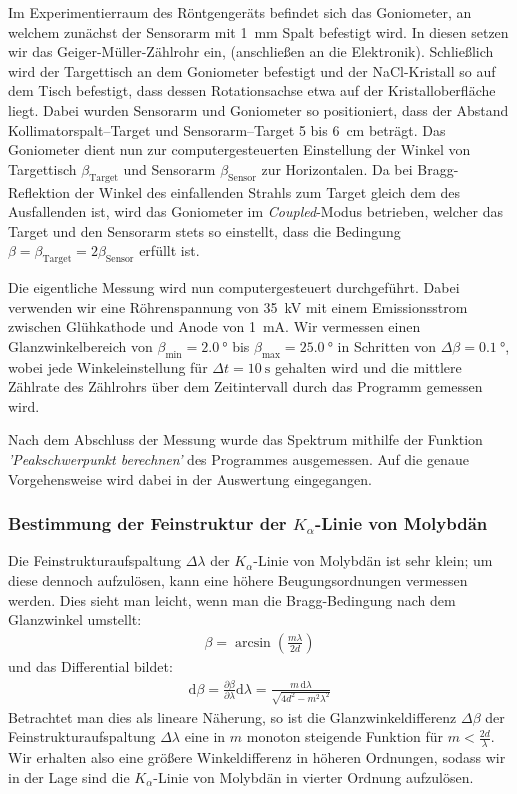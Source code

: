 \documentclass[10pt, a4paper]{article}
\begin{document}
Im Experimentierraum des Röntgengeräts befindet sich das Goniometer, an welchem zunächst der Sensorarm mit \SI{1}{\milli\metre} Spalt befestigt wird.
In diesen setzen wir das Geiger-Müller-Zählrohr ein, (anschließen an die Elektronik).
Schließlich wird der Targettisch an dem Goniometer befestigt und der NaCl-Kristall so auf dem Tisch befestigt, dass dessen Rotationsachse etwa auf der Kristalloberfläche liegt.
Dabei wurden Sensorarm und Goniometer so positioniert, dass der Abstand Kollimatorspalt--Target und Sensorarm--Target \num{5} bis \SI{6}{\centi\metre} beträgt.
Das Goniometer dient nun zur computergesteuerten Einstellung der Winkel von Targettisch $\beta_\mathrm{Target}$ und Sensorarm $\beta_\mathrm{Sensor}$ zur Horizontalen.
Da bei Bragg-Reflektion der Winkel des einfallenden Strahls zum Target gleich dem des Ausfallenden ist, wird das Goniometer im \emph{Coupled}-Modus betrieben, welcher das Target und den Sensorarm stets so einstellt, dass die Bedingung $\beta = \beta_\mathrm{Target} = 2\beta_\mathrm{Sensor}$ erfüllt ist.

Die eigentliche Messung wird nun computergesteuert durchgeführt.
Dabei verwenden wir eine Röhrenspannung von \SI{35}{\kilo\volt} mit einem Emissionsstrom zwischen Glühkathode und Anode von \SI{1}{\milli\ampere}.
Wir vermessen einen Glanzwinkelbereich von $\beta_\mathrm{min} = \SI{2,0}{\degree}$ bis $\beta_\mathrm{max} = \SI{25,0}{\degree}$ in Schritten von $\Delta \beta = \SI{0,1}{\degree}$, wobei jede Winkeleinstellung für $\Delta t = \SI{10}{\second}$ gehalten wird und die mittlere Zählrate des Zählrohrs über dem Zeitintervall durch das Programm gemessen wird.

Nach dem Abschluss der Messung wurde das Spektrum mithilfe der Funktion \emph{'Peakschwerpunkt berechnen'} des Programmes ausgemessen. Auf die genaue Vorgehensweise wird dabei in der Auswertung eingegangen.

\subsubsection{Bestimmung der Feinstruktur der $K_\alpha$-Linie von Molybdän}
Die Feinstrukturaufspaltung $\Delta \lambda$ der $K_\alpha$-Linie von Molybdän ist sehr klein; um diese dennoch aufzulösen, kann eine höhere Beugungsordnungen vermessen werden.
Dies sieht man leicht, wenn man die Bragg-Bedingung nach dem Glanzwinkel umstellt:
\begin{align}
  \beta = \arcsin \left( \frac{m \lambda}{2 d} \right)
\end{align}
und das Differential bildet:
\begin{align}
  \mathrm{d}\beta = \frac{\partial \beta}{\partial \lambda} \mathrm{d}\lambda = \frac{m\, \mathrm{d}\lambda}{\sqrt{4 d^2 - m^2 \lambda^2}}
\end{align}
Betrachtet man dies als lineare Näherung, so ist die Glanzwinkeldifferenz $\Delta \beta$ der Feinstrukturaufspaltung $\Delta \lambda$ eine in $m$ monoton steigende Funktion für $m < \frac{2d}{\lambda}$.
Wir erhalten also eine größere Winkeldifferenz in höheren Ordnungen, sodass wir in der Lage sind die $K_\alpha$-Linie von Molybdän in vierter Ordnung aufzulösen.
\end{document}
